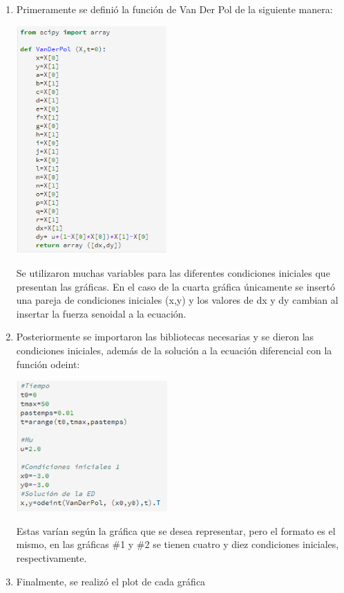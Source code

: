 \documentclass[12pt]{article}
\begin{document}
\begin{enumerate}
\item Primeramente se definió la función de Van Der Pol de la siguiente manera: 

\begin{center}
        \includegraphics[height=8.7cm]{1.png}
\end{center}

Se utilizaron muchas variables para las diferentes condiciones iniciales que presentan las gráficas. En el caso de la cuarta gráfica únicamente se insertó una pareja de condiciones iniciales (x,y) y los valores de dx y dy cambian al insertar la fuerza senoidal a la ecuación.

\item Posteriormente se importaron las bibliotecas necesarias y se dieron las condiciones iniciales, además de la solución a la ecuación diferencial con la función odeint: 
\begin{center}
        \includegraphics[height=5cm]{2.png}
\end{center}
Estas varían según la gráfica que se desea representar, pero el formato es el mismo, en las gráficas \#1 y \#2 se tienen cuatro y diez condiciones iniciales, respectivamente. 
\item Finalmente, se realizó el plot de cada gráfica
\end{enumerate}
\end{document}
